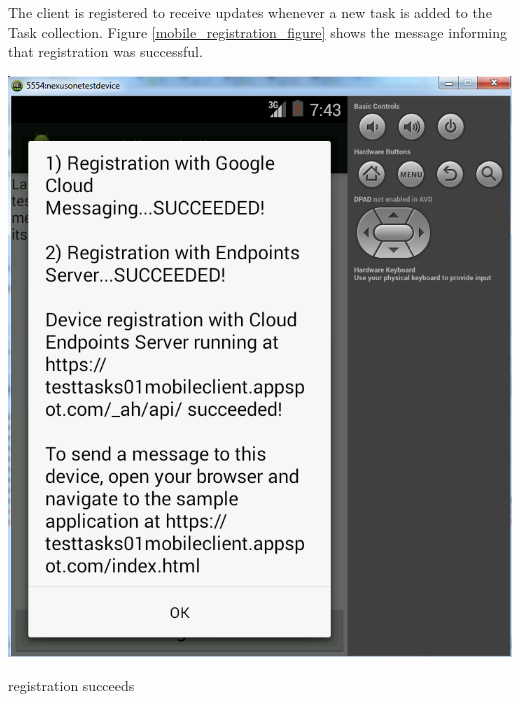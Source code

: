 \pagebreak
The client is registered to receive updates whenever a new task is added to the Task collection. Figure \ref{mobile_registration_figure} shows the message informing that registration was successful.\\
\begin{center}
	\centering
	\includegraphics[scale=0.7]{images/googlemessagin_isonline_cloudmessaging.png}
	\caption{registration succeeds}
	\label{mobile_registration_figure}
\end{center}

